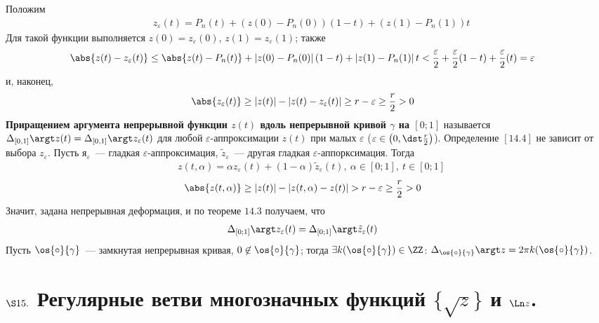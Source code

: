 Положим
\begin{align*}
  & z_\varepsilon(t) = P_n(t) + \left( z(0)-P_n(0) \right)\left( 1-t \right) + \left( z(1)-P_n(1) \right)t
\end{align*}
Для такой функции выполняется $z(0) = z_\varepsilon(0)$, $z(1) =
z_\varepsilon(1)$; также
\begin{align*}
  & \abs{z(t) - z_\varepsilon(t)} \leq \abs{z(t) - P_n(t)} + \left| z(0)-P_n(0) \right| \left( 1-t \right) + \left| z(1)-P_n(1) \right|t < \frac{\varepsilon}{2} + \frac{\varepsilon}{2}(1-t) + \frac{\varepsilon}{2}(t) = \varepsilon
\end{align*}
и, наконец,
\begin{align*}
  & \abs{z_\varepsilon(t)} \geq \left| z(t) \right| - \left| z(t) - z_\varepsilon(t) \right| \geq r - \varepsilon \geq \frac{r}{2} > 0
\end{align*}
\Def
\textbf{Приращением аргумента непрерывной функции $z(t)$ вдоль непрерывной
  кривой $\gamma$ на $[0;1]$} называется $\Delta_{[0,1]}\argt z(t) =
\Delta_{[0,1]}\argt z_\varepsilon(t)$ для любой $\varepsilon$-аппроксимации
$z(t)$ при малых $\varepsilon$ ($\varepsilon \in \left( 0, \dst \frac{r}{2}
\right)$).
\prop
Определение $[14.4]$ не зависит от выбора $z_\varepsilon$.
\pr
Пусть $я_\varepsilon$~--- гладкая $\varepsilon$-аппроксимация,
$\tilde{z}_\varepsilon$~--- другая гладкая $\varepsilon$-аппорксимация.
Тогда
\begin{align*}
  & z(t, \alpha) = \alpha z_\varepsilon(t) + (1-\alpha)\tilde{z}_\varepsilon(t), \ \alpha \in [0;1], \ t \in [0;1]
\end{align*}
\begin{align*}
  & \abs{z(t, \alpha)} \geq \left| z(t) \right| - \left| z(t, \alpha) - z(t) \right| > r - \varepsilon \geq \frac{r}{2} > 0
\end{align*}
Значит, задана непрерывная деформация, и по теореме $14.3$ получаем, что
\begin{align*}
  & \Delta_{[0;1]}\argt z_\varepsilon(t) = \Delta_{[0;1]}\argt \tilde{z}_\varepsilon(t)
\end{align*}
\corollary
Пусть $\os{\circ}{\gamma}$~--- замкнутая непрерывная кривая, $0 \not \in
\os{\circ}{\gamma}$; тогда $\exists k(\os{\circ}{\gamma})\in \ZZ$:
$\Delta_{\os{\circ}{\gamma}}\argt z = 2 \pi k(\os{\circ}{\gamma})$.
\section{$\S 15.$ Регулярные ветви многозначных функций $\{\sqrt{z}\}$ и $\Ln z$.}
